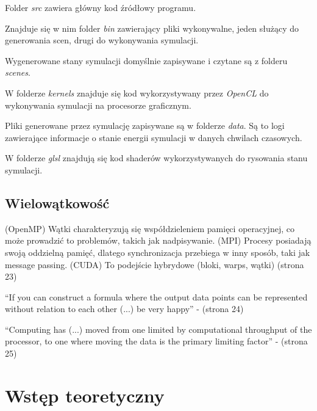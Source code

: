\documentclass[12pt, letterpaper]{report}
\begin{document}
    Folder \emph{src} zawiera główny kod źródłowy programu. 
    
    Znajduje się w nim folder \emph{bin} zawierający pliki wykonywalne, jeden służący do generowania scen, drugi do wykonywania symulacji. 
    
    Wygenerowane stany symulacji domyślnie zapisywane i czytane są z folderu \emph{scenes}. 
    
    W folderze \emph{kernels} znajduje się kod wykorzystywany przez \emph{OpenCL} do wykonywania symulacji na procesorze graficznym. 
    
    Pliki generowane przez symulację zapisywane są w folderze \emph{data}. Są to logi zawierające informacje o stanie energii
    symulacji w danych chwilach czasowych.
    
    W folderze \emph{glsl} znajdują się kod shaderów wykorzystywanych do rysowania stanu symulacji.
    
    \section{Wielowątkowość}
    (OpenMP) Wątki charakteryzują się współdzieleniem pamięci operacyjnej, co może prowadzić to problemów, takich jak nadpisywanie.
    (MPI) Procesy posiadają swoją oddzielną pamięć, dlatego synchronizacja przebiega w inny sposób, taki jak message passing.
    (CUDA) To podejście hybrydowe (bloki, warps, wątki)  \cite{cuda} (strona 23)

    ``If you can construct a formula where the output data points can be represented without 
    relation to each other (...) be very happy'' - \cite{cuda} (strona 24)
    
    ``Computing has (...) moved from one limited by computational throughput of the 
    processor, to one where moving the data is the primary limiting factor'' - \cite{cuda} (strona 25)
    
\chapter{Wstęp teoretyczny}
\end{document}
